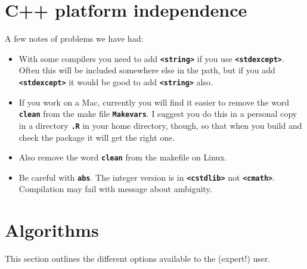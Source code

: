 \documentclass[12pt, a4paper]{article}
\renewcommand{\=}{\,=\,}
\newcommand{\+}{\,+\,}
\newcommand{\sfn}[1]{\textbf{\texttt{#1}}}
\begin{document}
\section{C++ platform independence}
A few notes of problems we have had:
\begin{itemize}
\item With some compilers you need to add \sfn{<string>} if you use
  \sfn{<stdexcept>}. Often this will be included somewhere else in the path, but
  if you add \sfn{<stdexcept>} it would be good to add \sfn{<string>} also.
  \item If you work on a Mac, currently you will find it easier to remove the
    word \sfn{clean} from the make file \sfn{Makevars}. I suggest you do this in
    a personal copy in a directory \sfn{.R} in your home directory, though, so
    that when you build and check the package it will get the right one.
\item Also remove the word \sfn{clean} from the makefile on Linux.
  \item Be careful with \sfn{abs}. The integer version is in \sfn{<cstdlib>} not
    \sfn{<cmath>}. Compilation may fail with message about ambiguity.
\end{itemize}
\section{Algorithms}
This section outlines the different options available to the (expert!) user.
\end{document}
